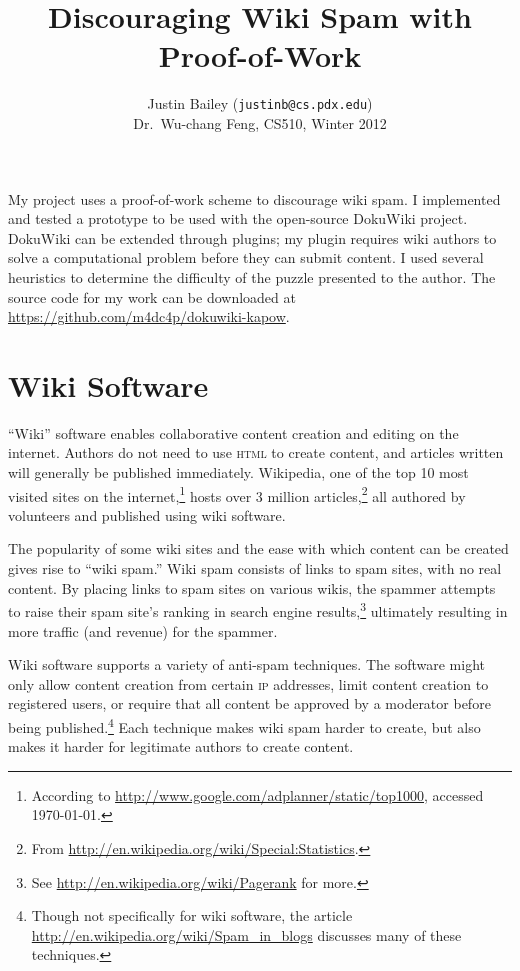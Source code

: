 \documentclass[12pt]{article}
\def\ip{\textsc{ip}\xspace}
\begin{document}
\VerbatimFootnotes
\title{Discouraging Wiki Spam with Proof-of-Work}
\author{Justin Bailey (\texttt{justinb@cs.pdx.edu}) \\ Dr.~Wu-chang Feng, CS510, Winter 2012}
\maketitle

My project uses a proof-of-work scheme to discourage wiki spam. I
implemented and tested a prototype to be used with the open-source
DokuWiki project. DokuWiki can be extended through plugins; my plugin
requires wiki authors to solve a computational problem before they can
submit content. I used several heuristics to determine the difficulty
of the puzzle presented to the author. The source code for my work can
be downloaded at \url{https://github.com/m4dc4p/dokuwiki-kapow}.

\section*{Wiki Software}

``Wiki'' software enables collaborative content creation and editing
on the internet. Authors do not need to use \textsc{html} to create
content, and articles written will generally be published immediately.
Wikipedia, one of the top 10 most visited sites on the
internet,\footnote{According to
  \url{http://www.google.com/adplanner/static/top1000}, accessed
  \today.} hosts over 3 million
articles,\footnote{From \url{http://en.wikipedia.org/wiki/Special:Statistics}.}
  all authored by volunteers and published using wiki software.

The popularity of some wiki sites and the ease with which content can
be created gives rise to ``wiki spam.'' Wiki spam consists
of links to spam sites, with no real content. By placing links to spam sites on various wikis, the
spammer attempts to raise their spam site's ranking in search engine
results,\footnote{See \url{http://en.wikipedia.org/wiki/Pagerank} for
  more.}  ultimately resulting in more traffic (and revenue) for the spammer.

Wiki software supports a variety of anti-spam techniques. The software
might only allow content creation from certain \ip addresses,
limit content creation to registered users, or require that all
content be approved by a moderator before being
published.\footnote{Though not specifically for wiki software, the
  article \url{http://en.wikipedia.org/wiki/Spam_in_blogs} discusses
  many of these techniques.} Each technique makes wiki spam harder
to create, but also makes it harder for legitimate authors to create content.
\end{document}
